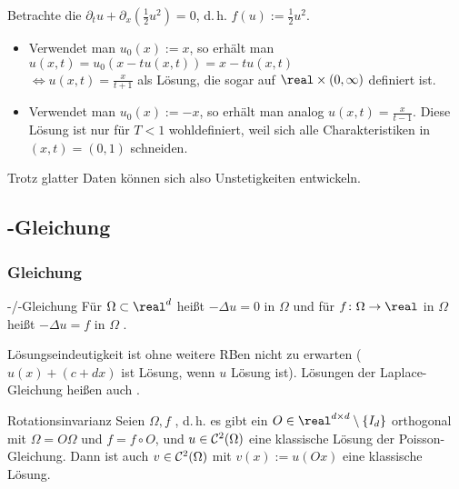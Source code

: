 \linie

\begin{Bsp}
    Betrachte die 
    $\partial_t u + \partial_x (\frac{1}{2} u^2) = 0$, d.\,h. $f(u) := \frac{1}{2} u^2$.
    \begin{itemize}
        \item
        Verwendet man $u_0(x) := x$, so erhält man
        $u(x, t) = u_0(x - t u(x, t)) = x - t u(x, t)$\\
        $\iff u(x, t) = \frac{x}{t + 1}$ als Lösung, die sogar auf $\real \times (0, \infty)$
        definiert ist.

        \item
        Verwendet man $u_0(x) := -x$, so erhält man analog $u(x, t) = \frac{x}{t - 1}$.
        Diese Lösung ist nur für $T < 1$ wohldefiniert, weil sich alle Charakteristiken in
        $(x, t) = (0, 1)$ schneiden.
    \end{itemize}
    Trotz glatter Daten können sich also Unstetigkeiten entwickeln.
\end{Bsp}

\pagebreak

\subsection{%
    -Gleichung%
}

\subsubsection{%
    Gleichung%
}

\begin{Def}{-/-Gleichung}
    Für $\Omega \subset \real^d$ heißt $-\Delta u = 0$ in $\Omega$
     und für $f\colon \Omega \to \real$ in $\Omega$ heißt
    $-\Delta u = f$ in $\Omega$ .
\end{Def}

\begin{Bem}
    Lösungseindeutigkeit ist ohne weitere RBen nicht zu erwarten
    ($u(x) + (c + dx)$ ist Lösung, wenn $u$ Lösung ist).
    Lösungen der Laplace-Gleichung heißen auch .
\end{Bem}

\linie

\begin{Satz}{Rotationsinvarianz}
    Seien $\Omega, f$ ,
    d.\,h. es gibt ein $O \in \real^{d \times d} \setminus \{I_d\}$ orthogonal mit
    $\Omega = O\Omega$ und $f = f \circ O$,
    und $u \in \mathcal{C}^2(\Omega)$ eine klassische Lösung der Poisson-Gleichung.
    Dann ist auch $v \in \mathcal{C}^2(\Omega)$ mit $v(x) := u(Ox)$ eine klassische Lösung.
\end{Satz}

